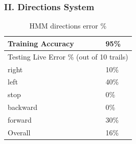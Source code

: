 \documentclass[12pt, a4paper, twoside]{report}
\begin{document}
\subsubsection{II. Directions System}
\begin{table}[!h]
\centering
\begin{tabular}{|l|l|}
\hline
Training Accuracy & 95\% \\ \hline
\multicolumn{2}{|l|}{Testing Live Error \% (out of 10 trails)} \\ \hline
right & 10\% \\ \hline
left & 40\% \\ \hline
stop & 0\% \\ \hline
backward & 0\% \\ \hline
forward & 30\% \\ \hline
Overall & 16\% \\ \hline
\end{tabular}
\caption{HMM directions error \%}
\label{tab:hmm-directions}
\end{table}
\end{document}
